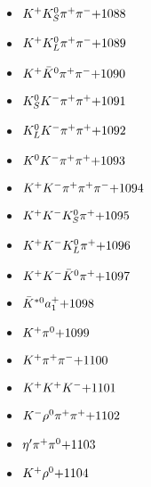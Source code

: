\begin{multicols}{3}
\begin{itemize}
 \item $ K^{+} K_{S}^{0} \pi^{+} \pi^{-} \hfill{+1088}$
 \item $ K^{+} K_{L}^{0} \pi^{+} \pi^{-} \hfill{+1089}$
 \item $ K^{+} \bar{K}^{0} \pi^{+} \pi^{-} \hfill{+1090}$
 \item $ K_{S}^{0} K^{-} \pi^{+} \pi^{+} \hfill{+1091}$
 \item $ K_{L}^{0} K^{-} \pi^{+} \pi^{+} \hfill{+1092}$
 \item $ K^{0} K^{-} \pi^{+} \pi^{+} \hfill{+1093}$
 \item $ K^{+} K^{-} \pi^{+} \pi^{+} \pi^{-} \hfill{+1094}$
 \item $ K^{+} K^{-} K_{S}^{0} \pi^{+} \hfill{+1095}$
 \item $ K^{+} K^{-} K_{L}^{0} \pi^{+} \hfill{+1096}$
 \item $ K^{+} K^{-} \bar{K}^{0} \pi^{+} \hfill{+1097}$
 \item $ \bar{K}^{*0} a_{1}^{+} \hfill{+1098}$
 \item $ K^{+} \pi^{0} \hfill{+1099}$
 \item $ K^{+} \pi^{+} \pi^{-} \hfill{+1100}$
 \item $ K^{+} K^{+} K^{-} \hfill{+1101}$
 \item $ K^{-} \rho^{0} \pi^{+} \pi^{+} \hfill{+1102}$
 \item $ {\eta^{\prime}} \pi^{+} \pi^{0} \hfill{+1103}$
 \item $ K^{+} \rho^{0} \hfill{+1104}$
 \end{itemize} 
 \end{multicols} 
